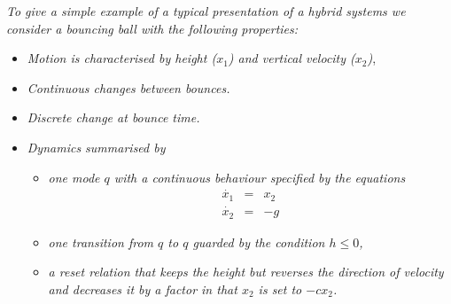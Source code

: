 \emph{To give a simple example of a typical presentation of a hybrid systems we consider a bouncing ball with the following properties:}
\begin{itemize}
\item \emph{Motion is characterised by \emph{height} ($x_{1}$) and \emph{vertical} velocity ($x_{2}$)},
\item \emph{Continuous changes between bounces.}
\item \emph{Discrete change at bounce time.}
\item \emph{Dynamics summarised by}
\begin{itemize}
\item \emph{one \emph{mode} $q$ with a continuous behaviour specified by the equations}
\begin{eqnarray*}
\dot{x_{1}} & = & x_{2}\\
\dot{x_{2}} & = & -g
\end{eqnarray*}
 
\item \emph{one \emph{transition} from $q$ to $q$ guarded by the condition $h \leq 0$,
}\item \emph{a reset relation that keeps the height but reverses the direction of velocity and decreases it by a factor in that $x_{2}$ is set to 
$-cx_{2}$.} 
\end{itemize}
\end{itemize}


